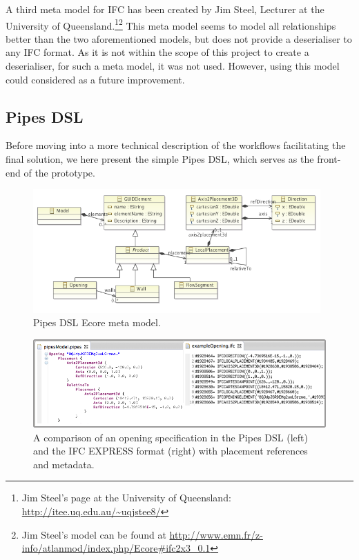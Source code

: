 A third meta model for IFC has been created by Jim Steel, Lecturer at the University of Queensland.\footnote{Jim Steel's page at the University of Queensland: \url{http://itee.uq.edu.au/~uqjstee8/}}\footnote{Jim Steel's model can be found at \url{http://www.emn.fr/z-info/atlanmod/index.php/Ecore#ifc2x3_0.1}} This meta model seems to model all relationships better than the two aforementioned models, but does not provide a deserialiser to any IFC format. As it is not within the scope of this project to create a deserialiser, for such a meta model, it was not used. However, using this model could considered as a future improvement.

\subsection{Pipes DSL}
\label{subsec:pipes_dsl}
Before moving into a more technical description of the workflows facilitating the final solution, we here present the simple Pipes DSL, which serves as the front-end of the prototype.

\begin{figure}[t]
    \centering
        \includegraphics[width=110mm]{images/PipesEcoreModel.png}
    \caption{Pipes DSL Ecore meta model.}
    \label{fig:pipes_dsl_ecore_model}
\end{figure}

\begin{figure}[t]
    \centering
        \includegraphics[width=120mm]{images/pipesAndExpressExample.png}
    \caption{A comparison of an opening specification in the Pipes DSL (left) and the IFC EXPRESS format (right) with placement references and metadata.}
    \label{fig:pipes_express_comparison}
\end{figure}

